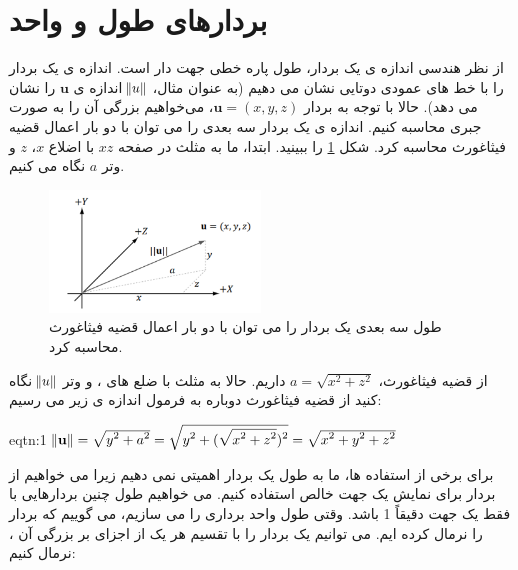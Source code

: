 \section{\textbf{بردارهای طول و واحد}}
{
    \Large
    \begin{spacing}{1.5}
        از نظر هندسی اندازه ی یک بردار، طول پاره خطی جهت دار است.
        اندازه ی یک بردار را با خط های عمودی دوتایی نشان می دهیم
        (به عنوان مثال، $\norm{u}$ اندازه ی $\textbf{u}$ را نشان می دهد).
        حالا با توجه به بردار $\textbf{u}=(x,y,z)$، می‌خواهیم بزرگی آن را به صورت جبری محاسبه کنیم.
        اندازه ی یک بردار سه بعدی را می توان با دو بار اعمال قضیه فیثاغورث محاسبه کرد.
        شکل \ref{fig:4.Session.1.1.8} را ببینید. ابتدا، ما به مثلث در صفحه $xz$ با اضلاع $x$، $z$ و وتر $a$ نگاه می کنیم.

        \begin{figure}[H]
            \centering
            \setlength{\belowcaptionskip}{-10pt}
            \includegraphics[width=0.5\textwidth]{Images/4/1/4.Session.1.1.8}
            \caption{طول سه بعدی یک بردار را می توان با دو بار اعمال قضیه فیثاغورث محاسبه کرد.}
            \label{fig:4.Session.1.1.8}
        \end{figure}

        از قضیه فیثاغورث، $a=\sqrt{\displaystyle x^2+z^2}$ داریم.
        حالا به مثلث با ضلع های ،  و وتر $\norm{u}$ نگاه کنید از قضیه فیثاغورث دوباره به فرمول اندازه ی زیر می رسیم:

        \begin{eqtn}{eqtn:1}
            \centering
            $\norm{\textbf{u}}=\sqrt{\displaystyle y^2+a^2}=\sqrt{\displaystyle y^2+(\sqrt{\displaystyle x^2+z^2})^2}=\sqrt{\displaystyle x^2+y^2+z^2}$
        \end{eqtn}

        برای برخی از استفاده ها، ما به طول یک بردار اهمیتی نمی دهیم زیرا می خواهیم از بردار برای نمایش یک جهت خالص استفاده کنیم.
        می خواهیم طول چنین بردارهایی با فقط یک جهت دقیقاً 1 باشد.
        وقتی طول واحد برداری را می سازیم، می گوییم که بردار را نرمال کرده ایم.
        می توانیم یک بردار را با تقسیم هر یک از اجزای بر بزرگی آن ، نرمال کنیم:


\end{spacing}}
